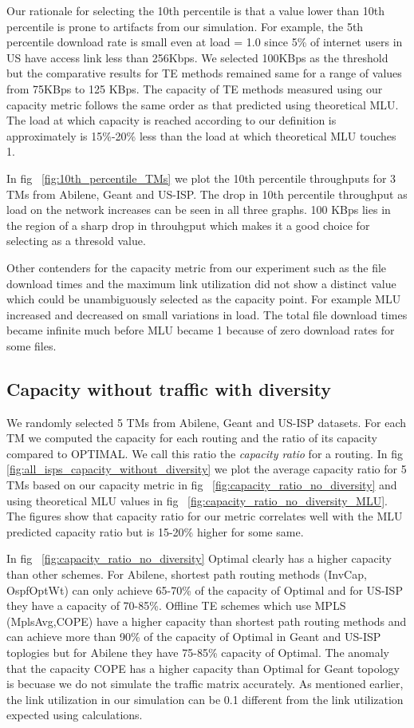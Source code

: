 Our rationale for selecting the 10th percentile is that a value lower than 10th percentile is prone to artifacts from our simulation.  For example, the 5th percentile download rate is small even at load = 1.0  since 5\% of internet users in US have access link less than 256Kbps. We selected 100KBps as the threshold but the comparative results for TE methods remained same for a range of values from 75KBps to 125 KBps. The capacity of TE methods measured using our capacity metric follows the same order as that predicted using theoretical MLU. The load at which capacity is reached according to our definition is approximately is  15\%-20\% less than the load at which theoretical MLU touches 1.

In fig ~\ref{fig:10th_percentile_TMs} we plot the 10th percentile throughputs for 3 TMs from Abilene, Geant and US-ISP. The drop in 10th percentile throughput as load on the network increases can be seen in all three graphs. 100 KBps lies in the region of a sharp drop in throuhgput which makes it a good choice for selecting as a thresold value.

Other contenders for the capacity metric from our experiment such as the file download times and the maximum link utilization did not show a distinct value which could be unambiguously selected as the capacity point. For example MLU increased and decreased on small variations in load. The total file download times became infinite much before MLU became 1 because of zero download rates for some files.

\subsection{Capacity without traffic with diversity }

We randomly selected 5 TMs from Abilene, Geant and US-ISP datasets. For each TM we computed the capacity for each routing and the ratio of its capacity compared to OPTIMAL. We call this ratio the \emph{capacity ratio} for a routing. In fig \ref{fig:all_isps_capacity_without_diversity} we plot the average capacity ratio for 5 TMs based on our capacity metric in fig ~\ref{fig:capacity_ratio_no_diversity} and using theoretical MLU values in fig ~\ref{fig:capacity_ratio_no_diversity_MLU}. The figures show that capacity ratio for our metric correlates well with the MLU predicted capacity ratio but is 15-20\% higher for some same.

In fig ~\ref{fig:capacity_ratio_no_diversity} Optimal clearly has a higher capacity than other schemes. For Abilene, shortest path routing methods (InvCap, OspfOptWt) can only achieve  65-70\% of the capacity of Optimal and for US-ISP they have a capacity of 70-85\%. Offline TE schemes which use MPLS (MplsAvg,COPE) have a higher capacity than shortest path routing methods and can achieve more than 90\% of the capacity of Optimal in Geant and  US-ISP toplogies but for Abilene they have 75-85\% capacity of Optimal. The anomaly that the capacity COPE has a higher capacity than Optimal  for Geant topology is becuase we do not simulate the traffic matrix accurately. As mentioned earlier, the link utilization in our simulation can be 0.1 different from the link utilization expected using calculations. 


